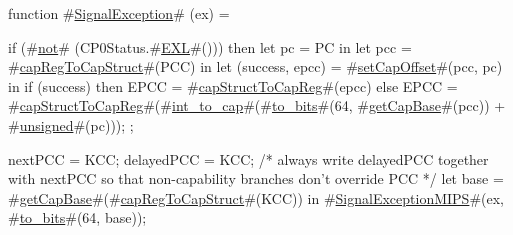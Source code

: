 function #\hyperref[zSignalException]{SignalException}# (ex) = 
  {
    if (#\hyperref[znot]{not}# (CP0Status.#\hyperref[zEXL]{EXL}#())) then {
      let pc  = PC in 
      let pcc = #\hyperref[zcapRegToCapStruct]{capRegToCapStruct}#(PCC) in
      let (success, epcc) = #\hyperref[zsetCapOffset]{setCapOffset}#(pcc, pc) in
      if (success) then
        EPCC = #\hyperref[zcapStructToCapReg]{capStructToCapReg}#(epcc)
      else
        EPCC = #\hyperref[zcapStructToCapReg]{capStructToCapReg}#(#\hyperref[zintzytozycap]{int\_to\_cap}#(#\hyperref[ztozybits]{to\_bits}#(64, #\hyperref[zgetCapBase]{getCapBase}#(pcc)) + #\hyperref[zunsigned]{unsigned}#(pc)));
    };

    nextPCC    = KCC;
    delayedPCC = KCC; /* always write delayedPCC together with nextPCC so 
                          that non-capability branches don't override PCC */
    let base = #\hyperref[zgetCapBase]{getCapBase}#(#\hyperref[zcapRegToCapStruct]{capRegToCapStruct}#(KCC)) in
    #\hyperref[zSignalExceptionMIPS]{SignalExceptionMIPS}#(ex, #\hyperref[ztozybits]{to\_bits}#(64, base));
  }
